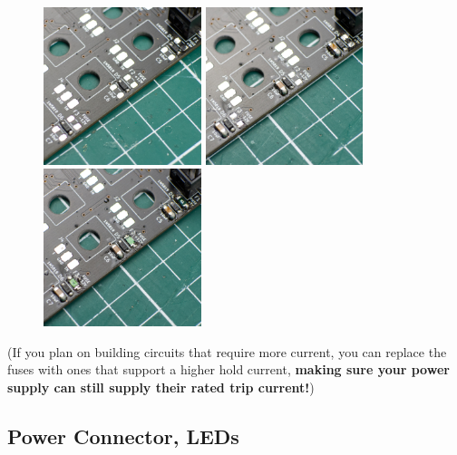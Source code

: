\documentclass[12pt, a4paper]{article}
\begin{document}
\begin{figure}[H]
    \centering
    \includegraphics[width=46mm]{images/section_1-1_diodes.jpg}
    \hspace{2mm}
    \includegraphics[width=46mm]{images/section_1-1_capacitors.jpg}
    \hspace{2mm}
    \includegraphics[width=46mm]{images/section_1-1_fuses.jpg}
\end{figure}

\begin{quoting}
    \small
    (If you plan on building circuits that require more current, you can replace the fuses with
    ones that support a higher hold current, \textbf{making sure your power supply can still
    supply their rated trip current!})
\end{quoting}

\pagebreak
\subsection{Power Connector, LEDs}
\end{document}
